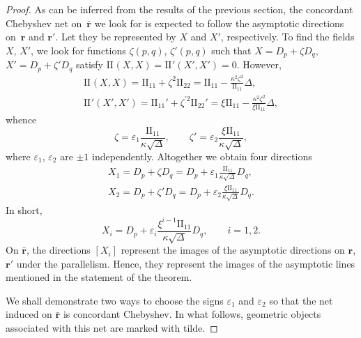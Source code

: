 \documentclass[pdftex]{sigma}
\let\ve\mathbf
\def\II#1#2{\mathrm{II}_{#1#2}}
\let\epsilon\varepsilon
\def\k{\kappa}
\numberwithin{equation}{section}
\begin{document}
\begin{proof}
As can be inferred from the results of the previous section,
the concordant Chebyshev net on~$\bar{\ve r}$ we look for is expected to follow
the asymptotic directions on~$\ve r$ and $\ve r'$.
Let they be represented by $X$ and $X'$, respectively.
To find the fields $X$, $X'$,
we look for functions $\zeta(p,q)$, $\zeta'(p,q)$
such that $X = D_p + \zeta D_q$, $X' = D_p + \zeta' D_q$ satisfy
$\II{}{} (X, X) = \II{}{}' (X', X') = 0$.
However, %
\begin{gather*}
\II{}{} (X, X)
 = \II11 + \zeta^2 \II22
 = \II 11 - \frac{\k^2 \zeta^2}{\II 11} \Delta, \\
\II{}{}' (X', X')
 = \II11' + \zeta^{\prime2} \II22'
 = \xi \II 11 - \frac{\k^2 \zeta^2}{\xi \II 11} \Delta,
\end{gather*}
whence %
\[
\zeta = \epsilon_1 \frac{\II 11}{\k \sqrt{\Delta}}, \qquad
\zeta' = \epsilon_2 \frac{\xi \II 11}{\k \sqrt{\Delta}},
\]
where $\epsilon_1$, $\epsilon_2$ are $\pm1$ independently.
Altogether we obtain four directions
\begin{gather*}
X_1 = D_p + \zeta D_q
 = D_p + \epsilon_1 \frac{\II 11}{\k \sqrt{\Delta}} D_q,
\\
X_2 = D_p + \zeta' D_q
 = D_p + \epsilon_2 \frac{\xi \II 11}{\k \sqrt{\Delta}} D_q.
\end{gather*}
In short, %
\[
X_i = D_p + \epsilon_i \frac{\xi^{i - 1} \II 11}{\k \sqrt{\Delta}} D_q,
\qquad i = 1,2.
\]
On $\bar{\ve r}$, the directions $[X_i]$ represent the images of
the asymptotic directions on $\ve r$, $\ve r'$ under the parallelism.
Hence, they represent the images of the asymptotic lines
mentioned in the statement of the theorem.

We shall demonstrate two ways to choose the signs $\epsilon_1$ and $\epsilon_2$
so that the net induced on $\bar{\ve r}$ is concordant Chebyshev.
In what follows, geometric objects associated with this net
are marked with tilde.


\end{proof}
\end{document}
